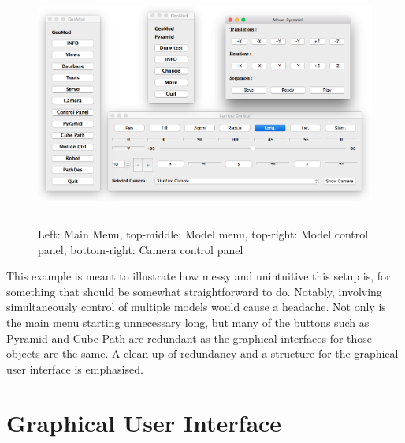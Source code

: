 \begin{figure}[ht]
    \centering
    \includegraphics[height=8cm]{images/example_control.png}
    \caption[Control panels]{Left: Main Menu, top-middle: Model menu, top-right: Model control panel, bottom-right: Camera control panel}
    \label{fig:controlpanels}
\end{figure}

This example is meant to illustrate how messy and unintuitive this setup is, for something that should be somewhat straightforward to do. Notably, involving simultaneously control of multiple models would cause a headache. Not only is the main menu starting unnecessary long, but many of the buttons such as Pyramid and Cube Path are redundant as the graphical interfaces for those objects are the same. A clean up of redundancy and a structure for the graphical user interface is emphasised.

\section{Graphical User Interface}

